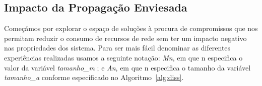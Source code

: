 
\subsection{Impacto da Propagação Enviesada}
\label{sec:evalDiss}
Começámos por explorar o espaço de soluções à procura de compromissos que nos permitam reduzir o consumo de recursos de rede sem ter um impacto negativo nas propriedades dos sistema.
Para ser mais fácil denominar as diferentes experiências realizadas usamos a seguinte notação: \textsl{Mn}, em que n especifica o valor da variável \textsl{tamanho\_m} ; e \textsl{An}, em que n especifica o tamanho da variável \textsl{tamanho\_a} conforme especificado no Algoritmo~\ref{alg:diss}.


